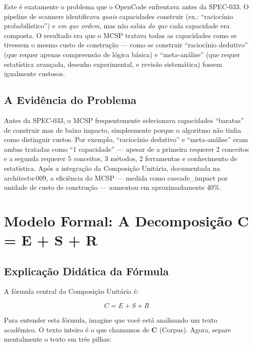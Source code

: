 Este é exatamente o problema que o OpenCode enfrentava antes da SPEC-033. O pipeline de scanners identificava \textit{quais} capacidades construir (ex.: ``raciocínio probabilístico'') e \textit{em que ordem}, mas não sabia \textit{do que} cada capacidade era composta. O resultado era que o MCSP tratava todas as capacidades como se tivessem o mesmo custo de construção — como se construir ``raciocínio dedutivo'' (que requer apenas compreensão de lógica básica) e ``meta-análise'' (que requer estatística avançada, desenho experimental, e revisão sistemática) fossem igualmente custosos.

\subsection{A Evidência do Problema}

Antes da SPEC-033, o MCSP frequentemente selecionava capacidades ``baratas'' de construir mas de baixo impacto, simplesmente porque o algoritmo não tinha como distinguir custos. Por exemplo, ``raciocínio dedutivo'' e ``meta-análise'' eram ambas tratadas como ``1 capacidade'' — apesar de a primeira requerer 2 conceitos e a segunda requerer 5 conceitos, 3 métodos, 2 ferramentas e conhecimento de estatística. Após a integração da Composição Unitária, documentada na architectu-009, a eficiência do MCSP — medida como cascade\_impact por unidade de custo de construção — aumentou em aproximadamente 40\%.

\section{Modelo Formal: A Decomposição C = E + S + R}

\subsection{Explicação Didática da Fórmula}

A fórmula central da Composição Unitária é:

\begin{equation}
C = E + S + R
\label{eq:decomposicao}
\end{equation}

Para entender esta fórmula, imagine que você está analisando um texto acadêmico. O texto inteiro é o que chamamos de \textbf{C} (Corpus). Agora, separe mentalmente o texto em três pilhas:

